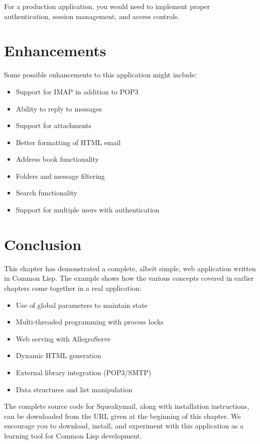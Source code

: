 For a production application, you would need to implement proper authentication, session
management, and access controls.

\section{Enhancements}

Some possible enhancements to this application might include:

\begin{itemize}
\item Support for IMAP in addition to POP3
\item Ability to reply to messages
\item Support for attachments
\item Better formatting of HTML email
\item Address book functionality
\item Folders and message filtering
\item Search functionality
\item Support for multiple users with authentication
\end{itemize}

\section{Conclusion}

This chapter has demonstrated a complete, albeit simple, web application written in Common
Lisp. The example shows how the various concepts covered in earlier chapters come together
in a real application:

\begin{itemize}
\item Use of global parameters to maintain state
\item Multi-threaded programming with process locks
\item Web serving with AllegroServe
\item Dynamic HTML generation
\item External library integration (POP3/SMTP)
\item Data structures and list manipulation
\end{itemize}

The complete source code for Squeakymail, along with installation instructions, can be
downloaded from the URL given at the beginning of this chapter. We encourage you to
download, install, and experiment with this application as a learning tool for Common Lisp
development.
